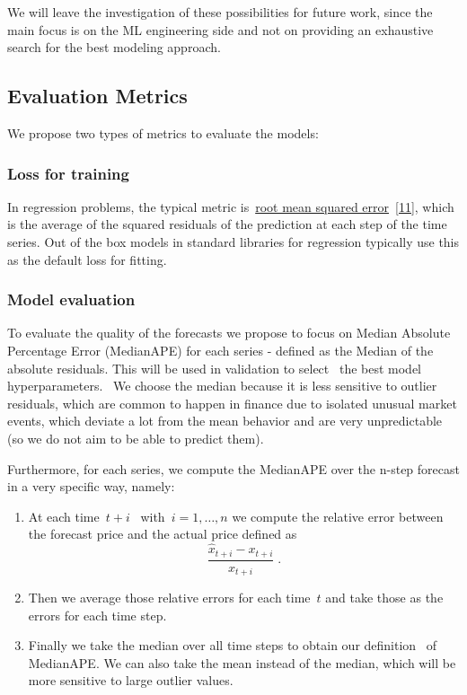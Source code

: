 \documentclass[10pt]{article}
\providecommand{\tightlist}{\setlength{\itemsep}{0pt}\setlength{\parskip}{0pt}}%
\begin{document}
We will leave the investigation of these possibilities for future work,
since the main focus is on the ML engineering side and not on providing
an exhaustive search for the best modeling approach.

\subsection{Evaluation Metrics}

{\label{463309}}

We propose two types of metrics to evaluate the models:

\subsubsection{Loss for training~}

{\label{365893}}

In regression problems, the typical metric
is~\href{https://scikit-learn.org/stable/modules/generated/sklearn.metrics.root_mean_squared_error.html}{root
mean squared error}~\hyperref[csl:11]{[11]}, which is the average of the
squared residuals of the prediction at each step of the time series. Out
of the box models in standard libraries for regression typically use
this as the default loss for fitting.

\subsubsection{Model evaluation}

{\label{502405}}

To evaluate the quality of the forecasts we propose to focus on Median
Absolute Percentage Error (MedianAPE) for each series - defined as the
Median of the absolute residuals. This will be used in validation to
select~ the best model hyperparameters.~ We choose the median because it
is less sensitive to outlier residuals, which are common to happen in
finance due to isolated unusual market events, which deviate a lot from
the mean behavior and are very unpredictable (so we do not aim to be
able to predict them).~

Furthermore, for each series, we compute the MedianAPE over the n-step
forecast in a very specific way, namely:

\begin{enumerate}
\tightlist
\item
  At each time~\(t+i\)~ with~\(i=1,\ldots,n\) we compute
  the relative error between the forecast price and the actual price
  defined as~~\[\dfrac{\hat{x}_{t+i} - x_{t+i}}{x_{t+i}}\; .\]
\item
  Then we average those relative errors for each time~\(t\)
  and take those as the errors for each time step.
\item
  Finally we take the median over all time steps to obtain our
  definition~ of MedianAPE. We can also take the mean instead of the
  median, which will be more sensitive to large outlier values.
\end{enumerate}
\end{document}

